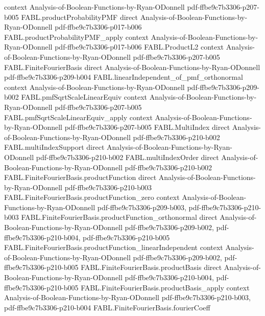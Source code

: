 \begin{theorem}
  {context}
  {Analysis-of-Boolean-Functions-by-Ryan-ODonnell}
  {pdf-ffbe9c7b3306-p207-b005}
\proofstep
  {FABL.productProbabilityPMF}
  {direct}
  {Analysis-of-Boolean-Functions-by-Ryan-ODonnell}
  {pdf-ffbe9c7b3306-p017-b006}
\proofstep
  {FABL.productProbabilityPMF_apply}
  {context}
  {Analysis-of-Boolean-Functions-by-Ryan-ODonnell}
  {pdf-ffbe9c7b3306-p017-b006}
\proofstep
  {FABL.ProductL2}
  {context}
  {Analysis-of-Boolean-Functions-by-Ryan-ODonnell}
  {pdf-ffbe9c7b3306-p207-b005}
\proofstep
  {FABL.FiniteFourierBasis}
  {direct}
  {Analysis-of-Boolean-Functions-by-Ryan-ODonnell}
  {pdf-ffbe9c7b3306-p209-b004}
\proofstep
  {FABL.linearIndependent_of_pmf_orthonormal}
  {context}
  {Analysis-of-Boolean-Functions-by-Ryan-ODonnell}
  {pdf-ffbe9c7b3306-p209-b002}
\proofstep
  {FABL.pmfSqrtScaleLinearEquiv}
  {context}
  {Analysis-of-Boolean-Functions-by-Ryan-ODonnell}
  {pdf-ffbe9c7b3306-p207-b005}
\proofstep
  {FABL.pmfSqrtScaleLinearEquiv_apply}
  {context}
  {Analysis-of-Boolean-Functions-by-Ryan-ODonnell}
  {pdf-ffbe9c7b3306-p207-b005}
\proofstep
  {FABL.MultiIndex}
  {direct}
  {Analysis-of-Boolean-Functions-by-Ryan-ODonnell}
  {pdf-ffbe9c7b3306-p210-b002}
\proofstep
  {FABL.multiIndexSupport}
  {direct}
  {Analysis-of-Boolean-Functions-by-Ryan-ODonnell}
  {pdf-ffbe9c7b3306-p210-b002}
\proofstep
  {FABL.multiIndexOrder}
  {direct}
  {Analysis-of-Boolean-Functions-by-Ryan-ODonnell}
  {pdf-ffbe9c7b3306-p210-b002}
\proofstep
  {FABL.FiniteFourierBasis.productFunction}
  {direct}
  {Analysis-of-Boolean-Functions-by-Ryan-ODonnell}
  {pdf-ffbe9c7b3306-p210-b003}
\proofstep
  {FABL.FiniteFourierBasis.productFunction_zero}
  {context}
  {Analysis-of-Boolean-Functions-by-Ryan-ODonnell}
  {pdf-ffbe9c7b3306-p209-b003,
    pdf-ffbe9c7b3306-p210-b003}
\proofstep
  {FABL.FiniteFourierBasis.productFunction_orthonormal}
  {direct}
  {Analysis-of-Boolean-Functions-by-Ryan-ODonnell}
  {pdf-ffbe9c7b3306-p209-b002,
    pdf-ffbe9c7b3306-p210-b004,
    pdf-ffbe9c7b3306-p210-b005}
\proofstep
  {FABL.FiniteFourierBasis.productFunction_linearIndependent}
  {context}
  {Analysis-of-Boolean-Functions-by-Ryan-ODonnell}
  {pdf-ffbe9c7b3306-p209-b002,
    pdf-ffbe9c7b3306-p210-b005}
\proofstep
  {FABL.FiniteFourierBasis.productBasis}
  {direct}
  {Analysis-of-Boolean-Functions-by-Ryan-ODonnell}
  {pdf-ffbe9c7b3306-p210-b004,
    pdf-ffbe9c7b3306-p210-b005}
\proofstep
  {FABL.FiniteFourierBasis.productBasis_apply}
  {context}
  {Analysis-of-Boolean-Functions-by-Ryan-ODonnell}
  {pdf-ffbe9c7b3306-p210-b003,
    pdf-ffbe9c7b3306-p210-b004}
\proofstep
  {FABL.FiniteFourierBasis.fourierCoeff}

\end{theorem}
